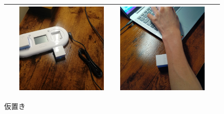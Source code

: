 \documentclass[paper=a4paper,jafontsize=9pt,head_space=15mm,gutter=20mm,
twocolumn,number_of_lines=49, line_length=26zw]{myuarticle}
\begin{document}
\begin{figure}[t]
\begin{tabular}{|c|c|c|c|}
\begin{minipage}[c]{0.15\textwidth}
    \end{minipage}     &
    \begin{minipage}[c]{0.15\textwidth}
      \centering
      \includegraphics[width=0.9\textwidth]{resources/doc_after.jpg}
    \end{minipage}     &
    \begin{minipage}[c]{0.15\textwidth}
      \centering
      \includegraphics[width=0.9\textwidth]{resources/pet_after.jpg}
    \end{minipage}
    \\ \hline
  \end{tabular}
  \caption{仮置き}
\end{figure}
\end{document}
